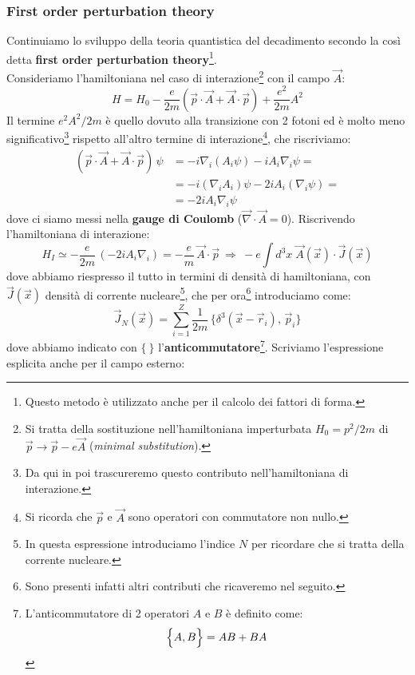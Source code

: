 \subsubsection{First order perturbation theory}\label{sec-first-order} Continuiamo lo sviluppo della teoria quantistica del decadimento secondo la così detta \textbf{first order perturbation theory}\footnote{Questo metodo è utilizzato anche per il calcolo dei fattori di forma.}.\\
Consideriamo l'hamiltoniana nel caso di interazione\footnote{Si tratta della sostituzione nell'hamiltoniana imperturbata $H_0 = p^2/2m$ di  $\vec{p}\to\vec{p}-e\vec{A}$ (\textit{minimal substitution}).} con il campo $\vec{A}$:
$$H = H_0 - \frac{e}{2m}(\vec{p}\cdot\vec{A}+\vec{A}\cdot\vec{p})+\frac{e^2}{2m}A^2$$
Il termine $e^2A^2/2m$ è quello dovuto alla transizione con 2 fotoni ed è molto meno significativo\footnote{Da qui in poi trascureremo questo contributo nell'hamiltoniana di interazione.} rispetto all'altro termine di interazione\footnote{Si ricorda che $\vec{p}$ e $\vec{A}$ sono operatori con commutatore non nullo.}, che riscriviamo:
\begin{displaymath}
\begin{aligned}
(\vec{p}\cdot\vec{A}+\vec{A}\cdot\vec{p}) \,\psi &= -i\nabla_i (A_i\psi) - i A_i \nabla_i \psi = \\
&= -i (\nabla_i A_i )\psi - 2i A_i (\nabla_i\psi) = \\
&= -2i A_i \nabla_i \psi
\end{aligned}
\end{displaymath}
dove ci siamo messi nella \textbf{gauge di Coulomb} ($\vec{\nabla}\cdot\vec{A}=0$). Riscrivendo l'hamiltoniana di interazione:
$$H_I \simeq - \frac{e}{2m}\,(-2iA_i\nabla_i) = -\frac{e}{m}\, \vec{A}\cdot\vec{p}\:\Rightarrow\: -e \int d^3x \; \vec{A}(\vec{x})\cdot \vec{J}(\vec{x})$$
dove abbiamo riespresso il tutto in termini di densità di hamiltoniana, con $\vec{J}(\vec{x})$ densità di corrente nucleare\footnote{In questa espressione introduciamo l'indice $N$ per ricordare che si tratta della corrente nucleare.}, che per ora\footnote{Sono presenti infatti altri contributi che ricaveremo nel seguito.} introduciamo come:
$$\vec{J}_N (\vec{x}) = \sum_{i=1}^Z \frac{1}{2m}\,\Biggl \{ \delta^3(\vec{x}-\vec{r}_i),\, \vec{p}_i \Biggr \}$$
dove abbiamo indicato con $\bigl\{\:\bigr\}$ l'\textbf{anticommutatore}\footnote{L'anticommutatore di 2 operatori $A$ e $B$ è definito come:
$$\Bigl\{A,B\Bigr\} = AB+BA$$}. Scriviamo l'espressione esplicita anche per il campo esterno:
